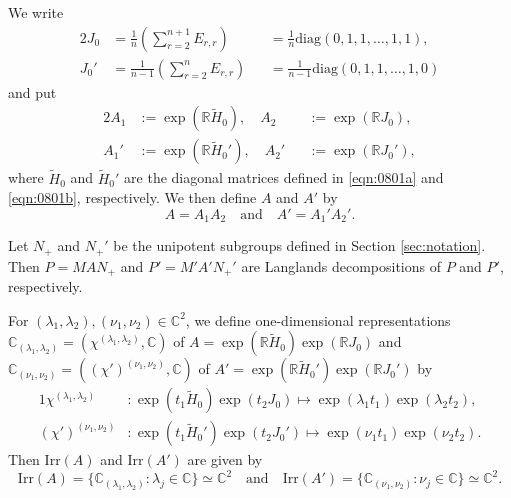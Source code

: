 \documentclass[reqno,11pt]{amsart}
\theoremstyle{remark}
\theoremstyle{definition}
\numberwithin{equation}{section}
\newcommand{\R}{\mathbb{R}}
\newcommand{\C}{\mathbb{C}}
\newcommand{\Irr}{\mathrm{Irr}}
\newcommand{\wH}{\widetilde{H}}
\newcommand{\diag}{\mathrm{diag}}
\begin{document}
We write
\begin{alignat*}{2}
J_0&=\frac{1}{n}(\sum^{n+1}_{r=2}E_{r,r})
&&=\frac{1}{n}\diag(0, 1, 1, \ldots, 1,1),\\
J_0'&=\frac{1}{n-1}(\sum^n_{r=2}E_{r,r})
&&=\frac{1}{n-1}\diag(0, 1, 1, \ldots, 1,0)
\end{alignat*}
and put 
\begin{alignat*}{2}
A_1&:=\exp(\R \wH_0), \quad A_2&&:=\exp(\R J_0),\\
A_1'&:=\exp(\R \wH_0'), \quad A_2'&&:=\exp(\R J_0'),
\end{alignat*}
where $\wH_0$ and $\wH_0'$ are the diagonal matrices defined in
\eqref{eqn:0801a} and \eqref{eqn:0801b}, respectively. 
We then define $A$ and $A'$ by
\begin{equation*}
A=A_1A_2
\quad
\text{and}
\quad
A'=A_1'A_2'.
\end{equation*}

Let $N_+$ and $N_+'$ be the unipotent subgroups defined in Section \ref{sec:notation}.
Then $P=MAN_+$ and $P'=M'A'N_+'$ are Langlands decompositions of $P$ 
and $P'$, respectively.

For $(\lambda_1,\lambda_2),(\nu_1,\nu_2) \in \C^2$, 
we define one-dimensional representations 
$\C_{(\lambda_1,\lambda_2)}=(\chi^{(\lambda_1,\lambda_2)}, \C)$ 
of $A=\exp(\R\wH_0)\exp(\R J_0)$ 
and
$\C_{(\nu_1,\nu_2)} = ((\chi')^{(\nu_1,\nu_2)},\C)$ of 
$A' = \exp(\R \wH_0')\exp(\R J_0')$ by
\begin{alignat*}{1}
\chi^{(\lambda_1,\lambda_2)} 
&\colon \exp(t_1 \wH_0)\exp(t_2 J_0)
 \longmapsto \exp(\lambda_1 t_1)\exp(\lambda_2 t_2),\\[3pt]
(\chi')^{(\nu_1,\nu_2)}&\colon \exp(t_1 \wH_0')\exp(t_2 J_0') \longmapsto 
\exp(\nu_1 t_1)\exp(\nu_2 t_2).
\end{alignat*}
Then $\Irr(A)$ and $\Irr(A')$ are given by
\begin{equation*}
\Irr(A)=\{\C_{(\lambda_1,\lambda_2)} : \lambda_j \in \C\} \simeq \C^2
\quad
\text{and}
\quad
\Irr(A')=\{\C_{(\nu_1,\nu_2)} : \nu_j \in \C\} \simeq \C^2.
\end{equation*}
\end{document}

